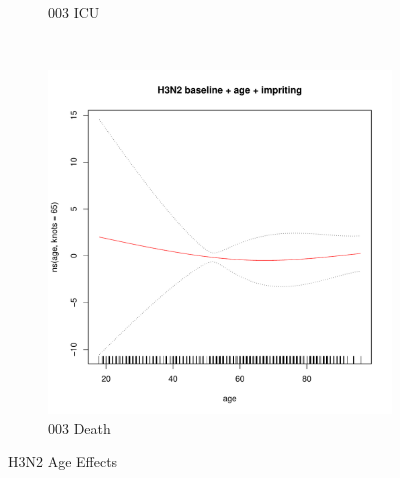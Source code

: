 \documentclass[12pt,twoside]{article}
\begin{document}
\begin{figure}[h]
{\begin{subfigure}{.49\linewidth}
                \caption{003 ICU}
        \end{subfigure}\\
        \begin{subfigure}{.49\linewidth}
                \includegraphics[width=\textwidth, page=1]{003Death_H3N2}
                \caption{003 Death}
        \end{subfigure}

        }
        \caption{H3N2 Age Effects}\label{reduced}
    \end{figure}
    
    
    
\end{document}
